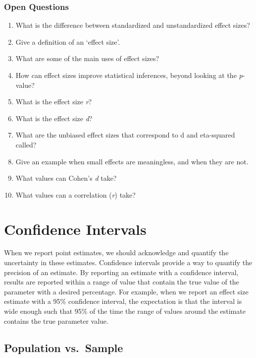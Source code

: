 \documentclass[
  oneside]{book}
\begin{document}
\hypertarget{open-questions-4}{%
\subsection{Open Questions}\label{open-questions-4}}

\begin{enumerate}
\def\labelenumi{\arabic{enumi}.}
\item
  What is the difference between standardized and unstandardized effect sizes?
\item
  Give a definition of an `effect size'.
\item
  What are some of the main uses of effect sizes?
\item
  How can effect sizes improve statistical inferences, beyond looking at the \emph{p}-value?
\item
  What is the effect size \emph{r}?
\item
  What is the effect size \emph{d}?
\item
  What are the unbiased effect sizes that correspond to d and eta-squared called?
\item
  Give an example when small effects are meaningless, and when they are not.
\item
  What values can Cohen's \emph{d} take?
\item
  What values can a correlation (\emph{r}) take?
\end{enumerate}

\hypertarget{confint}{%
\chapter{Confidence Intervals}\label{confint}}

When we report point estimates, we should acknowledge and quantify the uncertainty in these estimates. Confidence intervals provide a way to quantify the precision of an estimate. By reporting an estimate with a confidence interval, results are reported within a range of value that contain the true value of the parameter with a desired percentage. For example, when we report an effect size estimate with a 95\% confidence interval, the expectation is that the interval is wide enough such that 95\% of the time the range of values around the estimate contains the true parameter value.

\hypertarget{population-vs.-sample}{%
\section{Population vs.~Sample}\label{population-vs.-sample}}
\end{document}
